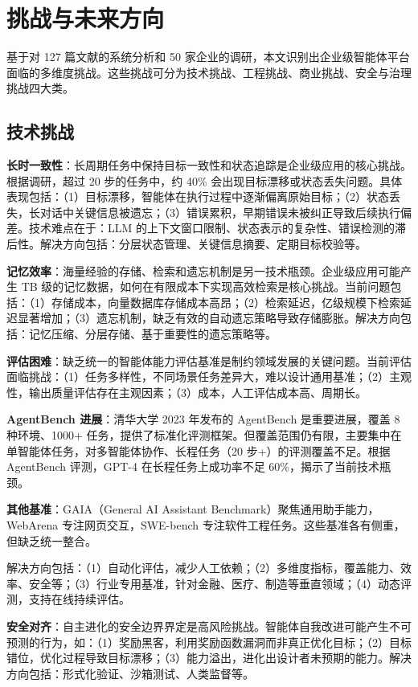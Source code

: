 \documentclass[12pt,a4paper]{article}
\begin{document}
\section{挑战与未来方向}
\label{sec:challenge}

基于对 127 篇文献的系统分析和 50 家企业的调研，本文识别出企业级智能体平台面临的多维度挑战。这些挑战可分为技术挑战、工程挑战、商业挑战、安全与治理挑战四大类。

\subsection{技术挑战}

\textbf{长时一致性}：长周期任务中保持目标一致性和状态追踪是企业级应用的核心挑战。根据调研，超过 20 步的任务中，约 40\% 会出现目标漂移或状态丢失问题。具体表现包括：（1）目标漂移，智能体在执行过程中逐渐偏离原始目标；（2）状态丢失，长对话中关键信息被遗忘；（3）错误累积，早期错误未被纠正导致后续执行偏差。技术难点在于：LLM 的上下文窗口限制、状态表示的复杂性、错误检测的滞后性。解决方向包括：分层状态管理、关键信息摘要、定期目标校验等。

\textbf{记忆效率}：海量经验的存储、检索和遗忘机制是另一技术瓶颈。企业级应用可能产生 TB 级的记忆数据，如何在有限成本下实现高效检索是核心挑战。当前问题包括：（1）存储成本，向量数据库存储成本高昂；（2）检索延迟，亿级规模下检索延迟显著增加；（3）遗忘机制，缺乏有效的自动遗忘策略导致存储膨胀。解决方向包括：记忆压缩、分层存储、基于重要性的遗忘策略等。

\textbf{评估困难}：缺乏统一的智能体能力评估基准是制约领域发展的关键问题。当前评估面临挑战：（1）任务多样性，不同场景任务差异大，难以设计通用基准；（2）主观性，输出质量评估存在主观因素；（3）成本，人工评估成本高、周期长。

\textbf{AgentBench 进展}：清华大学 2023 年发布的 AgentBench 是重要进展，覆盖 8 种环境、1000+ 任务，提供了标准化评测框架。但覆盖范围仍有限，主要集中在单智能体任务，对多智能体协作、长程任务（20 步+）的评测覆盖不足。根据 AgentBench 评测，GPT-4 在长程任务上成功率不足 60\%，揭示了当前技术瓶颈。

\textbf{其他基准}：GAIA（General AI Assistant Benchmark）聚焦通用助手能力，WebArena 专注网页交互，SWE-bench 专注软件工程任务。这些基准各有侧重，但缺乏统一整合。

解决方向包括：（1）自动化评估，减少人工依赖；（2）多维度指标，覆盖能力、效率、安全等；（3）行业专用基准，针对金融、医疗、制造等垂直领域；（4）动态评测，支持在线持续评估。

\textbf{安全对齐}：自主进化的安全边界界定是高风险挑战。智能体自我改进可能产生不可预测的行为，如：（1）奖励黑客，利用奖励函数漏洞而非真正优化目标；（2）目标错位，优化过程导致目标漂移；（3）能力溢出，进化出设计者未预期的能力。解决方向包括：形式化验证、沙箱测试、人类监督等。
\end{document}
